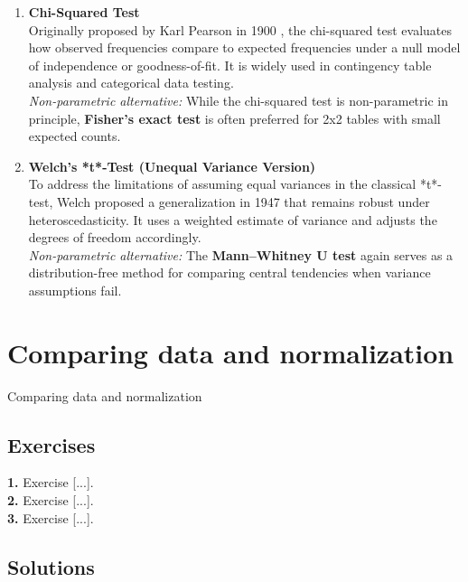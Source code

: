 \documentclass{book}
\begin{document}
\begin{enumerate}
\item \textbf{Chi-Squared Test}\\
Originally proposed by Karl Pearson in 1900 \cite{pearson1900}, the chi-squared test evaluates how observed frequencies compare to expected frequencies under a null model of independence or goodness-of-fit. It is widely used in contingency table analysis and categorical data testing.\\
\textit{Non-parametric alternative:} While the chi-squared test is non-parametric in principle, \textbf{Fisher’s exact test} is often preferred for 2x2 tables with small expected counts.

\item \textbf{Welch’s *t*-Test (Unequal Variance Version)}\\
To address the limitations of assuming equal variances in the classical *t*-test, Welch proposed a generalization in 1947 \cite{welch1947} that remains robust under heteroscedasticity. It uses a weighted estimate of variance and adjusts the degrees of freedom accordingly.\\
\textit{Non-parametric alternative:} The \textbf{Mann–Whitney U test} again serves as a distribution-free method for comparing central tendencies when variance assumptions fail.

\end{enumerate}

\newpage

\section{Comparing data and normalization}

Comparing data and normalization

\newpage

\subsection*{Exercises}

\textbf{1.} Exercise [...].\\

\textbf{2.} Exercise [...].\\

\textbf{3.} Exercise [...].\\

\newpage

\subsection*{Solutions}
\end{document}
